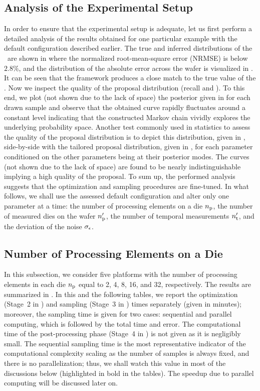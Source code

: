 \subsection{Analysis of the Experimental Setup}

In order to ensure that the experimental setup is adequate, let us first perform a detailed analysis of the results obtained for one particular example with the default configuration described earlier.
The true and inferred distributions of the \qoi\ are shown in  where the normalized root-mean-square error (NRMSE) is below $2.8\%$, and the distribution of the absolute error across the wafer is visualized in . It can be seen that the framework produces a close match to the true value of the \qoi.
Now we inspect the quality of the proposal distribution (recall  and ). To this end, we plot (not shown due to the lack of space) the posterior given in  for each drawn sample and observe that the obtained curve rapidly fluctuates around a constant level indicating that the constructed Markov chain vividly explores the underlying probability space.
Another test commonly used in statistics to assess the quality of the proposal distribution is to depict this distribution, given in , side-by-side with the tailored proposal distribution, given in , for each parameter conditioned on the other parameters being at their posterior modes.
The curves (not shown due to the lack of space) are found to be nearly indistinguishable implying a high quality of the proposal. To sum up, the performed analysis suggests that the optimization and sampling procedures are fine-tuned.
In what follows, we shall use the assessed default configuration and alter only one parameter at a time: the number of processing elements on a die ${n_\text{p}}$, the number of measured dies on the wafer ${n_\text{p}'}$, the number of temporal measurements ${n_\text{t}'}$, and the deviation of the noise $\sigma_\epsilon$.

\subsection{Number of Processing Elements on a Die}
In this subsection, we consider five platforms with the number of processing elements in each die ${n_\text{p}}$ equal to 2, 4, 8, 16, and 32, respectively. The results are summarized in .
In this and the following tables, we report the optimization (Stage~2 in ) and sampling (Stage~3 in ) times separately (given in minutes); moreover, the sampling time is given for two cases: sequential and parallel computing, which is followed by the total time and error. The computational time of the post-processing phase (Stage~4 in ) is not given as it is negligibly small.
The sequential sampling time is the most representative indicator of the computational complexity scaling as the number of samples is always fixed, and there is no parallelization; thus, we shall watch this value in most of the discussions below (highlighted in bold in the tables). The speedup due to parallel computing will be discussed later on.


